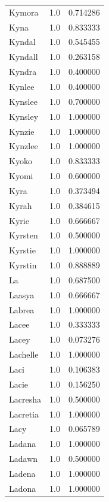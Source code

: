 \documentclass[
  letterpaper,
  DIV=11,
  numbers=noendperiod]{scrreprt}
\begin{document}
\begin{tabular}{lrr}
Kymora          &   1.0 &   0.714286 \\
Kyna            &   1.0 &   0.833333 \\
Kyndal          &   1.0 &   0.545455 \\
Kyndall         &   1.0 &   0.263158 \\
Kyndra          &   1.0 &   0.400000 \\
Kynlee          &   1.0 &   0.400000 \\
Kynslee         &   1.0 &   0.700000 \\
Kynsley         &   1.0 &   1.000000 \\
Kynzie          &   1.0 &   1.000000 \\
Kynzlee         &   1.0 &   1.000000 \\
Kyoko           &   1.0 &   0.833333 \\
Kyomi           &   1.0 &   0.600000 \\
Kyra            &   1.0 &   0.373494 \\
Kyrah           &   1.0 &   0.384615 \\
Kyrie           &   1.0 &   0.666667 \\
Kyrsten         &   1.0 &   0.500000 \\
Kyrstie         &   1.0 &   1.000000 \\
Kyrstin         &   1.0 &   0.888889 \\
La              &   1.0 &   0.687500 \\
Laasya          &   1.0 &   0.666667 \\
Labrea          &   1.0 &   1.000000 \\
Lacee           &   1.0 &   0.333333 \\
Lacey           &   1.0 &   0.073276 \\
Lachelle        &   1.0 &   1.000000 \\
Laci            &   1.0 &   0.106383 \\
Lacie           &   1.0 &   0.156250 \\
Lacresha        &   1.0 &   0.500000 \\
Lacretia        &   1.0 &   1.000000 \\
Lacy            &   1.0 &   0.065789 \\
Ladana          &   1.0 &   1.000000 \\
Ladawn          &   1.0 &   0.500000 \\
Ladena          &   1.0 &   1.000000 \\
Ladona          &   1.0 &   1.000000 \\

\end{tabular}
\end{document}
